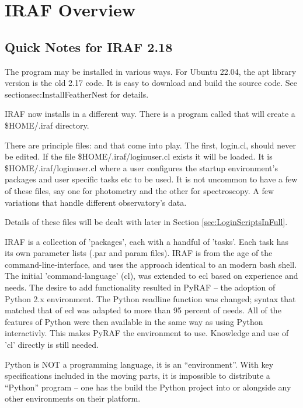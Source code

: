 
\renewcommand{\footerfilename}{IrafOverview.tex}

\section{IRAF Overview} \label{sec:IRAFOverview}

\subsection*{Quick Notes for IRAF 2.18}

The program may be installed in various ways. For Ubuntu 22.04, the 
apt library version is the old 2.17 code. It is easy to download and
build the source code. See section{sec:InstallFeatherNest} for details.

IRAF now installs in a different way. There is a program called 
that will create a \$HOME/.iraf directory. 

There are principle files:  and 
that come into play. The first, login.cl, should never be edited. If the file
\$HOME/.iraf/loginuser.cl exists it will be loaded. It is \$HOME/.iraf/loginuser.cl
where a user configures the startup environment's packages and user specific
tasks etc to be used. It is not uncommon to have a few of these files, say
one for photometry and the other for spectroscopy. A few variations that
handle different observatory's data. 

Details of these files will be dealt with later in Section \ref{sec:LoginScriptsInFull}.

IRAF  is a collection of
'packages', each with a handful of 'tasks'. Each task has its own
parameter lists (.par and param files). IRAF is from the age of the
command-line-interface, and uses the approach identical to an modern
bash shell. The initial 'command-language' (cl), was extended to ecl
based on experience and needs. The desire to add functionality
resulted in PyRAF -- the adoption of Python 2.x environment. The
Python readline function was changed; syntax that matched that of ecl
was adapted to more than 95 percent of needs. All of the features of
Python were then available in the same way as using Python
interactivly.  This makes PyRAF the environment to use. Knowledge and
use of 'cl' directly is still needed.

Python is NOT a programming language, it is an ``environment''. With key
specifications included in the moving parts, it is impossible to distribute
a ``Python'' program -- one has the build the Python project into or
alongside any other environments on their platform. 

